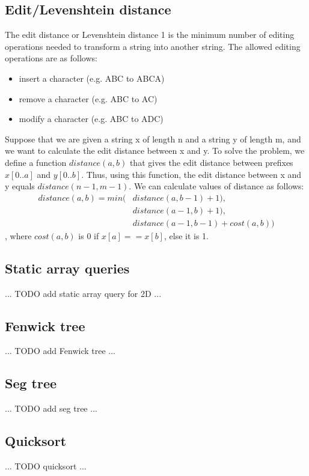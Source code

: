 \documentclass[a4paper]{article}
\begin{document}
\subsection{Edit/Levenshtein distance}
The edit distance or Levenshtein distance 1 is the minimum number of editing operations needed to transform a string into another string. The allowed editing operations are as follows:
\begin{itemize}
  \item insert a character (e.g. ABC to ABCA)
  \item remove a character (e.g. ABC to AC)
  \item modify a character (e.g. ABC to ADC)
\end{itemize}
Suppose that we are given a string x of length n and a string y of length m, and we want to calculate the edit distance between x and y. To solve the problem, we define a function $distance(a, b)$ that gives the edit distance between prefixes
$x[0..a]$ and $y[0..b]$. Thus, using this function, the edit distance between x and y equals $distance(n - 1, m - 1)$.
We can calculate values of distance as follows:
\begin{align}
  distance(a, b) = min(&distance(a, b - 1) + 1), \\
                       &distance(a - 1, b) + 1), \\
                       &distance(a - 1, b - 1) + cost(a, b))
\end{align}
, where $cost(a, b)$ is 0 if $x[a] == x[b]$, else it is 1.


\subsection{Static array queries}
... TODO add static array query for 2D ...


\subsection{Fenwick tree}
... TODO add Fenwick tree ...


\subsection{Seg tree}
... TODO add seg tree ...


\subsection{Quicksort}
... TODO quicksort ...
\end{document}
